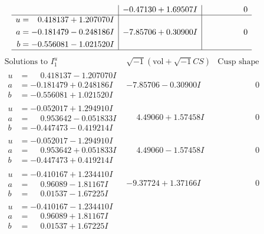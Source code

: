 \documentclass[1p]{elsarticle_modified}
\theoremstyle{definition}
\newcommand{\I}{\sqrt{-1}}
\begin{document}
$$\begin{array}{c|c|c}
 & -0.47130 + 1.69507 I & \phantom{-0.000000 } 0 \\ \hline\begin{aligned}
u &= \phantom{-}0.418137 + 1.207070 I \\
a &= -0.181479 - 0.248186 I \\
b &= -0.556081 - 1.021520 I\end{aligned}
 & -7.85706 + 0.30900 I & \phantom{-0.000000 } 0\\
 \hline 
 \end{array}$$\newpage$$\begin{array}{c|c|c}  
\text{Solutions to }I^u_{1}& \I (\text{vol} + \sqrt{-1}CS) & \text{Cusp shape}\\
 \hline 
\begin{aligned}
u &= \phantom{-}0.418137 - 1.207070 I \\
a &= -0.181479 + 0.248186 I \\
b &= -0.556081 + 1.021520 I\end{aligned}
 & -7.85706 - 0.30900 I & \phantom{-0.000000 } 0 \\ \hline\begin{aligned}
u &= -0.052017 + 1.294910 I \\
a &= \phantom{-}0.953642 - 0.051833 I \\
b &= -0.447473 - 0.419214 I\end{aligned}
 & \phantom{-}4.49060 + 1.57458 I & \phantom{-0.000000 } 0 \\ \hline\begin{aligned}
u &= -0.052017 - 1.294910 I \\
a &= \phantom{-}0.953642 + 0.051833 I \\
b &= -0.447473 + 0.419214 I\end{aligned}
 & \phantom{-}4.49060 - 1.57458 I & \phantom{-0.000000 } 0 \\ \hline\begin{aligned}
u &= -0.410167 + 1.234410 I \\
a &= \phantom{-}0.96089 - 1.81167 I \\
b &= \phantom{-}0.01537 - 1.67225 I\end{aligned}
 & -9.37724 + 1.37166 I & \phantom{-0.000000 } 0 \\ \hline\begin{aligned}
u &= -0.410167 - 1.234410 I \\
a &= \phantom{-}0.96089 + 1.81167 I \\
b &= \phantom{-}0.01537 + 1.67225 I\end{aligned}

\end{array}$$
\end{document}
